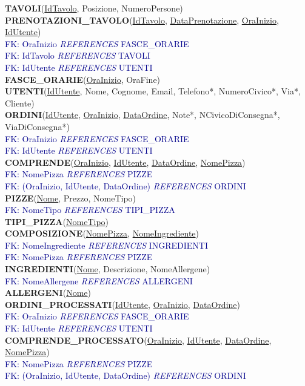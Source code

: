\documentclass[a4paper,12pt, oneside]{article}
\begin{document}
\textbf{TAVOLI}(\underline{IdTavolo}, Posizione, NumeroPersone) \\
\textbf{PRENOTAZIONI\_TAVOLO}(\underline{IdTavolo}, \underline{DataPrenotazione}, \underline{OraInizio}, \underline{IdUtente}) \\
\textcolor{darkBlue}{FK: OraInizio \textit{REFERENCES} FASCE\_ORARIE} \\
\textcolor{darkBlue}{FK: IdTavolo \textit{REFERENCES} TAVOLI} \\
\textcolor{darkBlue}{FK: IdUtente \textit{REFERENCES} UTENTI} \\
\textbf{FASCE\_ORARIE}(\underline{OraInizio}, OraFine) \\
\textbf{UTENTI}(\underline{IdUtente}, Nome, Cognome, Email, Telefono*, NumeroCivico*, Via*, Cliente) \\
\textbf{ORDINI}(\underline{IdUtente}, \underline{OraInizio}, \underline{DataOrdine}, Note*, NCivicoDiConsegna*, ViaDiConsegna*) \\
\textcolor{darkBlue}{FK: OraInizio \textit{REFERENCES} FASCE\_ORARIE} \\
\textcolor{darkBlue}{FK: IdUtente \textit{REFERENCES} UTENTI} \\
\textbf{COMPRENDE}(\underline{OraInizio}, \underline{IdUtente}, \underline{DataOrdine}, \underline{NomePizza}) \\
\textcolor{darkBlue}{FK: NomePizza \textit{REFERENCES} PIZZE} \\
\textcolor{darkBlue}{FK: (OraInizio, IdUtente, DataOrdine) \textit{REFERENCES} ORDINI} \\
\textbf{PIZZE}(\underline{Nome}, Prezzo, NomeTipo) \\
\textcolor{darkBlue}{FK: NomeTipo \textit{REFERENCES} TIPI\_PIZZA} \\
\textbf{TIPI\_PIZZA}(\underline{NomeTipo}) \\
\textbf{COMPOSIZIONE}(\underline{NomePizza}, \underline{NomeIngrediente}) \\
\textcolor{darkBlue}{FK: NomeIngrediente \textit{REFERENCES} INGREDIENTI} \\
\textcolor{darkBlue}{FK: NomePizza \textit{REFERENCES} PIZZE} \\
\textbf{INGREDIENTI}(\underline{Nome}, Descrizione, NomeAllergene) \\
\textcolor{darkBlue}{FK: NomeAllergene \textit{REFERENCES} ALLERGENI} \\
\textbf{ALLERGENI}(\underline{Nome}) \\
\textbf{ORDINI\_PROCESSATI}(\underline{IdUtente}, \underline{OraInizio}, \underline{DataOrdine}) \\
\textcolor{darkBlue}{FK: OraInizio \textit{REFERENCES} FASCE\_ORARIE} \\
\textcolor{darkBlue}{FK: IdUtente \textit{REFERENCES} UTENTI} \\
\textbf{COMPRENDE\_PROCESSATO}(\underline{OraInizio}, \underline{IdUtente}, \underline{DataOrdine}, \underline{NomePizza}) \\
\textcolor{darkBlue}{FK: NomePizza \textit{REFERENCES} PIZZE} \\
\textcolor{darkBlue}{FK: (OraInizio, IdUtente, DataOrdine) \textit{REFERENCES} ORDINI} \\
\end{document}
